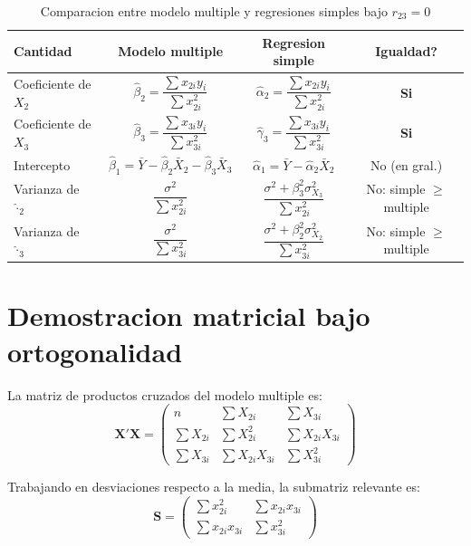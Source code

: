 \documentclass[12pt, letterpaper]{article}
\theoremstyle{remark}
\begin{document}
\begin{table}[ht]
\centering
\caption{Comparacion entre modelo multiple y regresiones simples bajo $r_{23} = 0$}
\label{tab:resumen}
\small
\begin{tabular}{lccc}
\toprule
\textbf{Cantidad} & \textbf{Modelo multiple} & \textbf{Regresion simple}
                  & \textbf{Igualdad?} \\
\midrule
Coeficiente de $X_2$
  & $\hat\beta_2 = \dfrac{\sum x_{2i}y_i}{\sum x_{2i}^2}$
  & $\hat\alpha_2 = \dfrac{\sum x_{2i}y_i}{\sum x_{2i}^2}$
  & \textbf{Si} \\[10pt]
Coeficiente de $X_3$
  & $\hat\beta_3 = \dfrac{\sum x_{3i}y_i}{\sum x_{3i}^2}$
  & $\hat\gamma_3 = \dfrac{\sum x_{3i}y_i}{\sum x_{3i}^2}$
  & \textbf{Si} \\[10pt]
Intercepto
  & $\hat\beta_1 = \bar Y - \hat\beta_2\bar X_2 - \hat\beta_3\bar X_3$
  & $\hat\alpha_1 = \bar Y - \hat\alpha_2\bar X_2$
  & No (en gral.) \\[10pt]
Varianza de $\hat\cdot_2$
  & $\dfrac{\sigma^2}{\sum x_{2i}^2}$
  & $\dfrac{\sigma^2 + \beta_3^2\sigma_{X_3}^2}{\sum x_{2i}^2}$
  & No: simple $\geq$ multiple \\[10pt]
Varianza de $\hat\cdot_3$
  & $\dfrac{\sigma^2}{\sum x_{3i}^2}$
  & $\dfrac{\sigma^2 + \beta_2^2\sigma_{X_2}^2}{\sum x_{3i}^2}$
  & No: simple $\geq$ multiple \\
\bottomrule
\end{tabular}
\end{table}

\appendix

\section{Demostracion matricial bajo ortogonalidad}

La matriz de productos cruzados del modelo multiple es:
\begin{equation}
  \mathbf{X'X} =
  \begin{pmatrix}
    n & \sum X_{2i} & \sum X_{3i}\\
    \sum X_{2i} & \sum X_{2i}^2 & \sum X_{2i}X_{3i}\\
    \sum X_{3i} & \sum X_{2i}X_{3i} & \sum X_{3i}^2
  \end{pmatrix}
  \label{eq:XpX}
\end{equation}

Trabajando en desviaciones respecto a la media, la submatriz relevante es:
\begin{equation}
  \mathbf{S} =
  \begin{pmatrix}
    \sum x_{2i}^2 & \sum x_{2i}x_{3i}\\
    \sum x_{2i}x_{3i} & \sum x_{3i}^2
  \end{pmatrix}
  \label{eq:S}
\end{equation}
\end{document}
